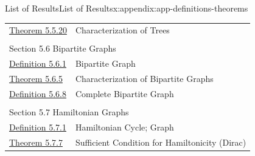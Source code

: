 \documentclass[oneside,10pt,]{book}
\numberwithin{equation}{section}
\begin{document}
\begin{appendixptx}{List of Results}{}{List of Results}{}{}{x:appendix:app-definitions-theorems}
\begin{longtable}[l]{ll}
\hyperref[x:theorem:thm-trees]{Theorem 5.5.20}& Characterization of Trees\\
\multicolumn{2}{l}{\null}\\[1.5ex] \multicolumn{2}{l}{\large Section 5.6 Bipartite Graphs}\\[0.5ex]
\hyperref[x:definition:def-bipartite]{Definition 5.6.1}& Bipartite Graph\\
\hyperref[x:theorem:thm-bipartite]{Theorem 5.6.5}& Characterization of Bipartite Graphs\\
\hyperref[x:definition:def-complete-bipartite]{Definition 5.6.8}& Complete Bipartite Graph\\
\multicolumn{2}{l}{\null}\\[1.5ex] \multicolumn{2}{l}{\large Section 5.7 Hamiltonian Graphs}\\[0.5ex]
\hyperref[x:definition:def-hamiltonian]{Definition 5.7.1}& Hamiltonian Cycle; Graph\\
\hyperref[x:theorem:thm-dirac]{Theorem 5.7.7}& Sufficient Condition for Hamiltonicity (Dirac)\\
\end{longtable}
\end{appendixptx}
%
%
\typeout{************************************************}
\typeout{************************************************}
%
\end{document}
